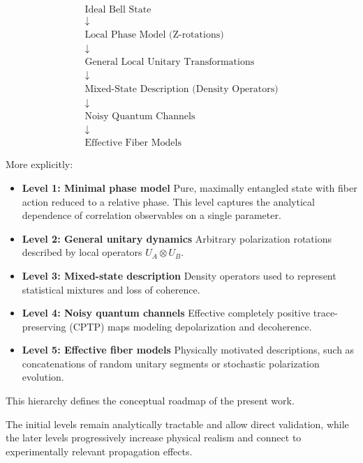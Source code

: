 \[
\begin{array}{c}
\text{Ideal Bell State} \\
\downarrow \\
\text{Local Phase Model (Z-rotations)} \\
\downarrow \\
\text{General Local Unitary Transformations} \\
\downarrow \\
\text{Mixed-State Description (Density Operators)} \\
\downarrow \\
\text{Noisy Quantum Channels} \\
\downarrow \\
\text{Effective Fiber Models}
\end{array}
\]

\medskip

More explicitly:

\begin{itemize}

\item \textbf{Level 1: Minimal phase model}  
Pure, maximally entangled state with fiber action reduced to a relative phase. This level captures the analytical dependence of correlation observables on a single parameter.

\item \textbf{Level 2: General unitary dynamics}  
Arbitrary polarization rotations described by local operators \( U_A \otimes U_B \).

\item \textbf{Level 3: Mixed-state description}  
Density operators used to represent statistical mixtures and loss of coherence.

\item \textbf{Level 4: Noisy quantum channels}  
Effective completely positive trace-preserving (CPTP) maps modeling depolarization and decoherence.

\item \textbf{Level 5: Effective fiber models}  
Physically motivated descriptions, such as concatenations of random unitary segments or stochastic polarization evolution.

\end{itemize}

\medskip

This hierarchy defines the conceptual roadmap of the present work.

The initial levels remain analytically tractable and allow direct validation, while the later levels progressively increase physical realism and connect to experimentally relevant propagation effects.

